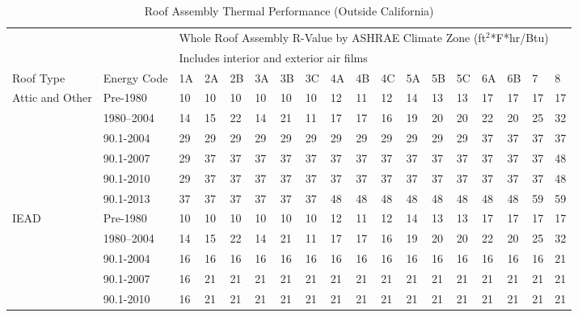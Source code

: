 \begin{table}
\scriptsize
\caption[Roof Assembly Thermal Performance (Outside California)]{Roof Assembly Thermal Performance (Outside California)}
\label{tab:roof_r_values}
\centering
\begin{tabular}{p{0.4in}p{0.5in}p{0.1in}p{0.1in}p{0.1in}p{0.1in}p{0.1in}p{0.1in}p{0.1in}p{0.1in}p{0.1in}p{0.1in}p{0.1in}p{0.1in}p{0.1in}p{0.1in}p{0.1in}p{0.1in}}
\hline
                &                   & \multicolumn{16}{l}{Whole Roof Assembly R-Value by ASHRAE Climate Zone (ft$^2$*F*hr/Btu)} \\
                &                   & \multicolumn{16}{l}{Includes interior and exterior air films} \\ \hline
Roof Type       & Energy Code       & 1A & 2A & 2B & 3A & 3B & 3C & 4A & 4B & 4C & 5A & 5B & 5C & 6A & 6B & 7  & 8   \\ \hline
Attic and Other & Pre-1980  & 10 & 10 & 10 & 10 & 10 & 10 & 12 & 11 & 12 & 14 & 13 & 13 & 17 & 17 & 17 & 17  \\
                &1980--2004 & 14 & 15 & 22 & 14 & 21 & 11 & 17 & 17 & 16 & 19 & 20 & 20 & 22 & 20 & 25 & 32  \\
                & 90.1-2004         & 29 & 29 & 29 & 29 & 29 & 29 & 29 & 29 & 29 & 29 & 29 & 29 & 37 & 37 & 37 & 37  \\
                & 90.1-2007         & 29 & 37 & 37 & 37 & 37 & 37 & 37 & 37 & 37 & 37 & 37 & 37 & 37 & 37 & 37 & 48  \\
                & 90.1-2010         & 29 & 37 & 37 & 37 & 37 & 37 & 37 & 37 & 37 & 37 & 37 & 37 & 37 & 37 & 37 & 48  \\
                & 90.1-2013         & 37 & 37 & 37 & 37 & 37 & 37 & 48 & 48 & 48 & 48 & 48 & 48 & 48 & 48 & 59 & 59  \\
IEAD            & Pre-1980  & 10 & 10 & 10 & 10 & 10 & 10 & 12 & 11 & 12 & 14 & 13 & 13 & 17 & 17 & 17 & 17  \\
                & 1980--2004 & 14 & 15 & 22 & 14 & 21 & 11 & 17 & 17 & 16 & 19 & 20 & 20 & 22 & 20 & 25 & 32  \\
                & 90.1-2004         & 16 & 16 & 16 & 16 & 16 & 16 & 16 & 16 & 16 & 16 & 16 & 16 & 16 & 16 & 16 & 21  \\
                & 90.1-2007         & 16 & 21 & 21 & 21 & 21 & 21 & 21 & 21 & 21 & 21 & 21 & 21 & 21 & 21 & 21 & 21  \\
                & 90.1-2010         & 16 & 21 & 21 & 21 & 21 & 21 & 21 & 21 & 21 & 21 & 21 & 21 & 21 & 21 & 21 & 21  \\

\end{tabular}
\end{table}
